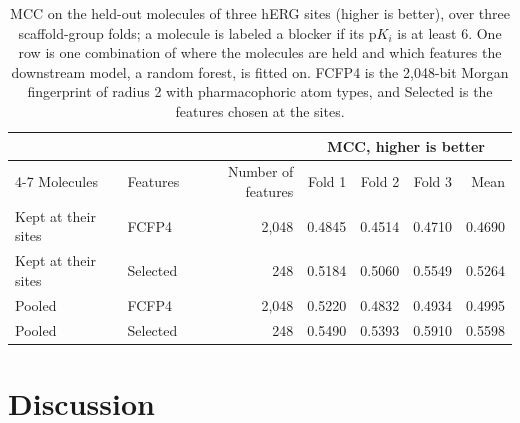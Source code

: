 \begin{table}[htbp]
\centering
\small
\begin{tabular}{@{}llrrrrr@{}}
\toprule
 & & & \multicolumn{4}{c}{MCC, higher is better} \\
\cmidrule(l){4-7}
Molecules & Features & Number of features & Fold 1 & Fold 2 & Fold 3 & Mean \\
\midrule
Kept at their sites & FCFP4 & 2,048 & 0.4845 & 0.4514 & 0.4710 & 0.4690 \\
Kept at their sites & Selected & 248 & 0.5184 & 0.5060 & 0.5549 & 0.5264 \\
Pooled & FCFP4 & 2,048 & 0.5220 & 0.4832 & 0.4934 & 0.4995 \\
Pooled & Selected & 248 & 0.5490 & 0.5393 & 0.5910 & 0.5598 \\
\bottomrule
\end{tabular}
\caption[MCC with molecules kept at three hERG sites or pooled]{MCC on the held-out molecules of three hERG sites (higher is better), over three scaffold-group folds; a molecule is labeled a blocker if its p$K_i$ is at least 6. One row is one combination of where the molecules are held and which features the downstream model, a random forest, is fitted on. FCFP4 is the 2,048-bit Morgan fingerprint of radius 2 with pharmacophoric atom types, and Selected is the features chosen at the sites.}
\label{tab:prelim_sites}
\end{table}


\section{Discussion}

